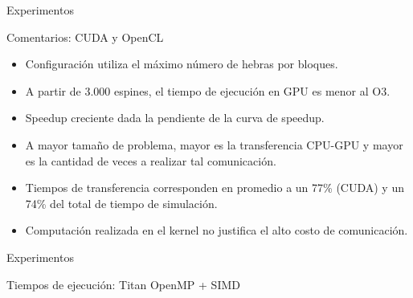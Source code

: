\begin{frame}{Experimentos}
\begin{block}{Comentarios: CUDA y OpenCL}
\begin{itemize}
	  \item Configuración utiliza el máximo número de hebras por bloques.
	  \item A partir de 3.000 espines, el tiempo de ejecución en GPU es menor al O3.
	  \item Speedup creciente dada la pendiente de la curva de speedup.
	  \item A mayor tamaño de problema, mayor es la transferencia CPU-GPU y mayor es la cantidad de veces a realizar tal comunicación.
	  \item Tiempos de transferencia corresponden en promedio a un 77\% (CUDA) y un 74\% del total de tiempo de simulación.
	  \item Computación realizada en el kernel no justifica el alto costo de comunicación.
	\end{itemize}
\end{block}
\end{frame}
\begin{frame}{Experimentos}
\begin{block}{Tiempos de ejecución: Titan OpenMP + SIMD}

\begin{columns}
  \begin{column}{.50\textwidth}
	\centerline{
      }
  \end{column}
  \begin{column}{.50\textwidth}
    \centerline{
      }
  \end{column}
\end{columns}
\end{block}
\end{frame}

